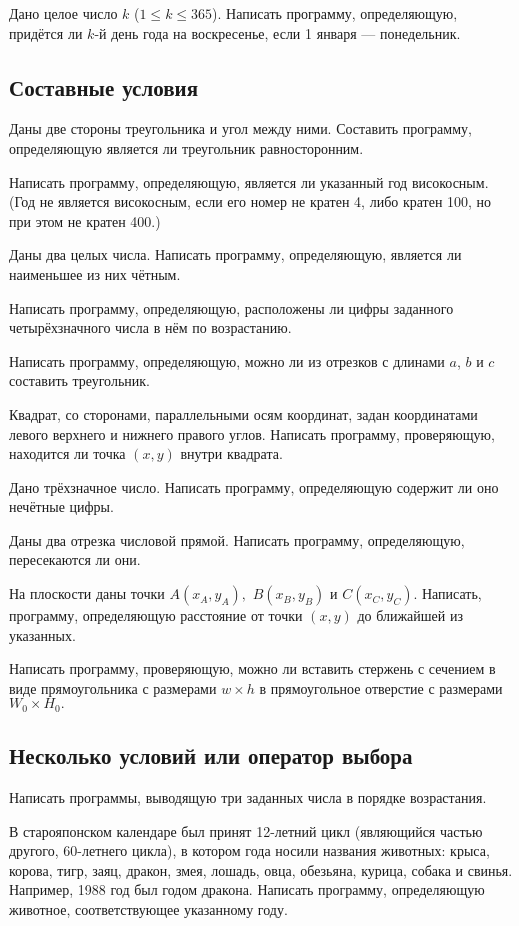 \task Дано целое число $k$ ($1 \leqslant k \leqslant 365$). Написать
программу, определяющую, придётся ли $k$-й день года на воскресенье,
если 1 января — понедельник.

\subsection{Составные условия} 

\task Даны две стороны треугольника и угол между ними. Составить
программу, определяющую является ли треугольник равносторонним.

\task Написать программу, определяющую, является ли указанный год
високосным. (Год не является високосным, если его номер не кратен 4,
либо кратен 100, но при этом не кратен 400.)

\task Даны два целых числа. Написать программу, определяющую, является
ли наименьшее из них чётным.

\task Написать программу, определяющую, расположены ли цифры заданного
четырёхзначного числа в нём по возрастанию.

\task Написать программу, определяющую, можно ли из отрезков с длинами
$a$, $b$ и $c$ составить треугольник.

\task Квадрат, со сторонами, параллельными осям координат, задан
координатами левого верхнего и нижнего правого углов. Написать
программу, проверяющую, находится ли точка $(x, y)$ внутри квадрата.

\task Дано трёхзначное число. Написать программу, определяющую
содержит ли оно нечётные цифры.

\task Даны два отрезка числовой прямой. Написать программу,
определяющую, пересекаются ли они.

\task На плоскости даны точки $A(x_A, y_A),$ $B(x_B, y_B)$ и $C(x_C,
y_C)$. Написать, программу, определяющую расстояние от точки $(x, y)$
до ближайшей из указанных.

\task Написать программу, проверяющую, можно ли вставить стержень с
сечением в виде прямоугольника с размерами $w×h$ в прямоугольное
отверстие с размерами $W_0×H_0.$

\subsection{Несколько условий или оператор выбора}

\task Написать программы, выводящую три заданных числа в порядке
возрастания.

\task В старояпонском календаре был принят 12-летний цикл (являющийся
частью другого, 60-летнего цикла), в котором года носили названия
животных: крыса, корова, тигр, заяц, дракон, змея, лошадь, овца,
обезьяна, курица, собака и свинья. Например, 1988 год был годом
дракона. Написать программу, определяющую животное, соответствующее
указанному году.

